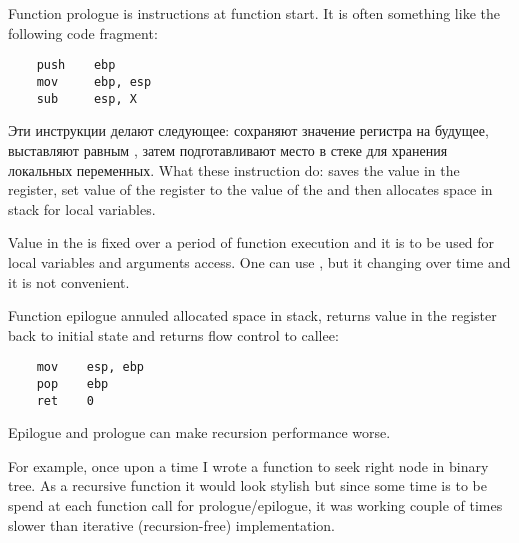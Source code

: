 ﻿\section{}
\label{sec:prologepilog}

{Function prologue is instructions at function start. It is often something like the following
code fragment:}

\begin{lstlisting}
    push    ebp
    mov     ebp, esp
    sub     esp, X
\end{lstlisting}

\IFRU
{Эти инструкции делают следующее: сохраняют значение регистра \EBP на будущее, выставляют \EBP равным \ESP, 
затем подготавливают место в стеке для хранения локальных переменных.}
{What these instruction do: saves the value in the \EBP register, set value of the \EBP register to the value of the \ESP and then allocates space in stack 
for local variables.}

{Value in the \EBP is fixed over a period of function execution and it is to be used for local variables and 
arguments access. 
One can use \ESP, but it changing over time and it is not convenient.}

{Function epilogue annuled allocated space in stack, returns value in the \EBP register back to initial state 
and returns flow control to callee:}

\begin{lstlisting}
    mov    esp, ebp
    pop    ebp
    ret    0
\end{lstlisting}

\index{\Recursion}
{Epilogue and prologue can make recursion performance worse.

For example, once upon a time I wrote a function to seek right node in binary tree. 
As a recursive function it would look stylish but since some time is to be spend at each function call
for prologue/epilogue, it was working couple of times slower than iterative (recursion-free)
implementation.}

